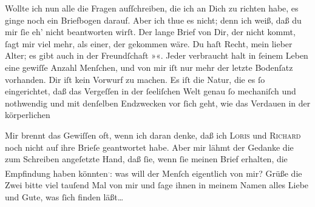 \pstart
           Wollte ich nun alle die Fragen aufſchreiben, die ich an Dich zu richten habe, es
               ginge noch ein Briefbogen darauf. Aber ich thue es nicht; denn ich weiß, daß du mir{ }ſie eh’ nicht beantworten wirſt. Der lange Brief\strikeout{,} von
               Dir, der nicht kommt,{ }ſagt mir viel mehr, als 
               einer, der gekom{\pb}men wäre. Du haſt Recht, mein
               lieber Alter; es gibt auch in der Freundſchaft »\label{K_L02669-16v}\label{K_L02669-16}«. Jeder verbraucht halt in{ }ſeinem Leben eine gewiſſe Anzahl Menſchen, und von
               mir iſt nur mehr der letzte Bodenſatz vorhanden. Dir iſt kein Vorwurf zu machen. Es
               iſt die Natur, die es{ }ſo eingerichtet, daß das Vergeſſen in der{ }ſeeliſchen Welt genau{ }ſo  mechaniſch und nothwendig und mit denſelben
               Endzwecken vor{ }ſich geht, wie das Verdauen in der körperlichen{\dotsfour}\pend
           
\pstart
           Mir brennt das Gewiſſen oft, wenn ich daran denke, daß ich \textsc{Loris} und \textsc{Richard} noch nicht auf ihre Brieſe geantwortet habe. Aber mir lähmt der Gedanke die zum
               Schreiben angeſetzte Hand, daß{ }ſie, wenn{ }ſie meinen Brief erhalten, die Empfindung
               haben könnten\substVorne{}\textsuperscript{\textcolor{gray}{,}}\substDazwischen{}:\substHinten{} was will der Menſch eigentlich von mir? Grüße die Zwei bitte viel {\pb}tauſend Mal von mir und{ }ſage ihnen in meinem Namen
               alles Liebe und Gute, was{ }ſich finden läßt{\dots}\pend
           
